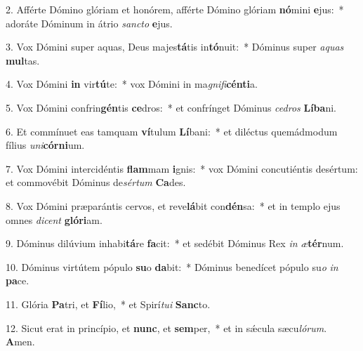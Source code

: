 2. Afférte Dómino glóriam et honórem, afférte Dómino glóriam \textbf{nó}mini \textbf{e}jus:~*  adoráte Dóminum in átrio \textit{sanc}\textit{to} \textbf{e}jus.\

3. Vox Dómini super aquas, Deus majes\textbf{tá}tis in\textbf{tó}nuit:~*  Dóminus super \textit{a}\textit{quas} \textbf{mul}tas.\

4. Vox Dómini \textbf{in} vir\textbf{tú}te:~*  vox Dómini in ma\textit{gni}\textit{fi}\textbf{cén}\textbf{ti}a.\

5. Vox Dómini confrin\textbf{gén}tis \textbf{ce}dros:~*  et confrínget Dóminus \textit{ce}\textit{dros} \textbf{Lí}\textbf{ba}ni.\

6. Et commínuet eas tamquam \textbf{ví}tulum \textbf{Lí}bani:~*  et diléctus quemádmodum fílius \textit{u}\textit{ni}\textbf{cór}\textbf{ni}um.\

7. Vox Dómini intercidéntis \textbf{flam}mam \textbf{i}gnis:~*  vox Dómini concutiéntis desértum: et commovébit Dóminus de\textit{sér}\textit{tum} \textbf{Ca}des.\

8. Vox Dómini præparántis cervos, et reve\textbf{lá}bit con\textbf{dén}sa:~*  et in templo ejus omnes \textit{di}\textit{cent} \textbf{gló}\textbf{ri}am.\

9. Dóminus dilúvium inhabi\textbf{tá}re \textbf{fa}cit:~*  et sedébit Dóminus Rex \textit{in} \textit{æ}\textbf{tér}num.\

10. Dóminus virtútem pópulo \textbf{su}o \textbf{da}bit:~*  Dóminus benedícet pópulo su\textit{o} \textit{in} \textbf{pa}ce.\

11. Glória \textbf{Pa}tri, et \textbf{Fí}lio,~*  et Spirí\textit{tu}\textit{i} \textbf{Sanc}to.\

12. Sicut erat in princípio, et \textbf{nunc}, et \textbf{sem}per,~*  et in sǽcula sæcu\textit{ló}\textit{rum}. \textbf{A}men.\

